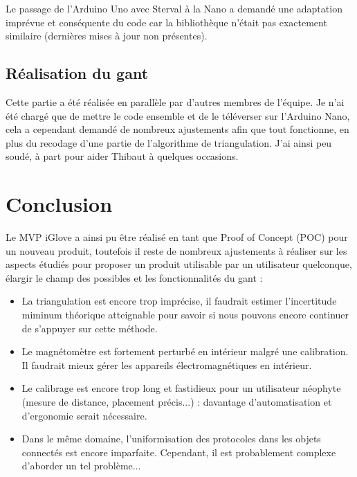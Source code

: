 \documentclass[10pt]{article}
\begin{document}
            Le passage de l'Arduino Uno avec Sterval à la Nano a demandé une adaptation imprévue et conséquente du code car la bibliothèque n'était pas exactement similaire
                (dernières mises à jour non présentes).
            
            
        \subsection{Réalisation du gant}
            Cette partie a été réalisée en parallèle par d'autres membres de l'équipe. 
            Je n'ai été chargé que de mettre le code ensemble et de le téléverser sur l'Arduino Nano, cela a cependant demandé
                de nombreux ajustements afin que tout fonctionne, en plus du recodage d'une partie de l'algorithme de triangulation.
            J'ai ainsi peu soudé, à part pour aider Thibaut à quelques occasions.

    \section{Conclusion}

            Le MVP iGlove a ainsi pu être réalisé en tant que Proof of Concept (POC) pour un nouveau produit,
             toutefois il reste de nombreux ajustements à réaliser sur les aspects étudiés pour 
             proposer un produit utilisable par un utilisateur quelconque,
             élargir le champ des possibles et les fonctionnalités du gant :
             \begin{itemize}
                \item La triangulation est encore trop imprécise, il faudrait estimer l'incertitude miminum théorique atteignable 
                        pour savoir si nous pouvons encore continuer de s'appuyer sur cette méthode.
                \item Le magnétomètre est fortement perturbé en intérieur malgré une calibration.
                        Il faudrait mieux gérer les appareils électromagnétiques en intérieur.
                \item Le calibrage est encore trop long et fastidieux pour un utilisateur néophyte (mesure de distance, placement précis...) :
                        davantage d'automatisation et d'ergonomie serait nécessaire.
                \item Dans le même domaine, l'uniformisation des protocoles dans les objets connectés est encore imparfaite. Cependant,
                        il est probablement complexe d'aborder un tel problème...
             \end{itemize}

\end{document}
